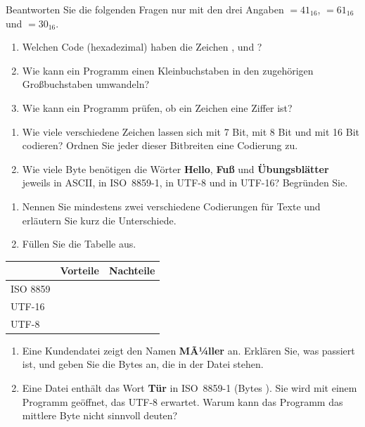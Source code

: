 Beantworten Sie die folgenden Fragen nur mit den drei Angaben  $= 41_{16}$,  $= 61_{16}$ und  $= 30_{16}$.
\begin{enumerate}[label=\alph*)]
\item Welchen Code (hexadezimal) haben die Zeichen ,  und ?
\item Wie kann ein Programm einen Kleinbuchstaben in den zugehörigen Großbuchstaben umwandeln?
\item Wie kann ein Programm prüfen, ob ein Zeichen  eine Ziffer ist?
\end{enumerate}

\begin{enumerate}[label=\alph*)]
\item Wie viele verschiedene Zeichen lassen sich mit 7 Bit, mit 8 Bit und mit 16 Bit codieren? Ordnen Sie jeder dieser Bitbreiten eine Codierung zu.
\item Wie viele Byte benötigen die Wörter \textbf{Hello}, \textbf{Fuß} und \textbf{Übungsblätter} jeweils in ASCII, in ISO~8859-1, in UTF-8 und in UTF-16? Begründen Sie.
\end{enumerate}

\begin{enumerate}[label=\alph*)]
\item Nennen Sie mindestens zwei verschiedene Codierungen für Texte und erläutern Sie kurz die Unterschiede.
\item Füllen Sie die Tabelle aus.
\end{enumerate}
\begin{center}
\renewcommand{\arraystretch}{2.2}
\begin{tabular}{|l|p{6cm}|p{6cm}|}
\hline
& \textbf{Vorteile} & \textbf{Nachteile} \\ \hline
ISO 8859 & & \\ \hline
UTF-16 & & \\ \hline
UTF-8 & & \\ \hline
\end{tabular}
\end{center}

\begin{enumerate}[label=\alph*)]
\item Eine Kundendatei zeigt den Namen \textbf{MÃ¼ller} an. Erklären Sie, was passiert ist, und geben Sie die Bytes an, die in der Datei stehen.
\item Eine Datei enthält das Wort \textbf{Tür} in ISO~8859-1 (Bytes ). Sie wird mit einem Programm geöffnet, das UTF-8 erwartet. Warum kann das Programm das mittlere Byte nicht sinnvoll deuten?
\end{enumerate}

